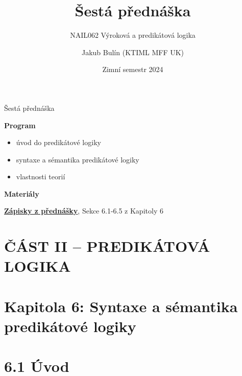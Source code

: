 \documentclass{beamer}
\title{Šestá přednáška}
\subtitle{NAIL062 Výroková a predikátová logika}
\author{Jakub Bulín (KTIML MFF UK)}
\date{Zimní semestr 2024}
\begin{document}
\maketitle


\begin{frame}{Šestá přednáška}

    \textbf{Program}
        \begin{itemize}
            \item úvod do predikátové logiky
            \item syntaxe a sémantika predikátové logiky
            \item vlastnosti teorií
        \end{itemize}

    \textbf{Materiály}

        \href{https://github.com/jbulin-mff-uk/nail062/raw/main/lecture/lecture-notes/lecture-notes.pdf}{\alert{\textbf{Zápisky z přednášky}}}, Sekce 6.1-6.5 z Kapitoly 6

\end{frame}


\section{ČÁST II -- PREDIKÁTOVÁ LOGIKA}


\section{\sc Kapitola 6: Syntaxe a sémantika predikátové logiky}


\section{6.1 Úvod}
\end{document}
